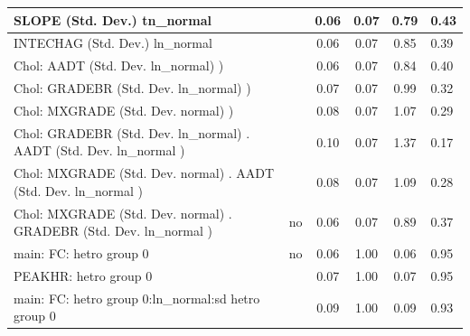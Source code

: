 \begin{table}
\begin{center}
\begin{tabular}{|l|l|c|c|c|l|}
			\hline
			SLOPE (Std. Dev.) tn_normal &  & 0.06 & 0.07 & 0.79 & 0.43 \\
			\hline
			INTECHAG (Std. Dev.) ln_normal &  & 0.06 & 0.07 & 0.85 & 0.39 \\
			\hline
			 Chol: AADT (Std. Dev. ln_normal) ) &  & 0.06 & 0.07 & 0.84 & 0.40 \\
			\hline
			 Chol: GRADEBR (Std. Dev. ln_normal) ) &  & 0.07 & 0.07 & 0.99 & 0.32 \\
			\hline
			 Chol: MXGRADE (Std. Dev. normal) ) &  & 0.08 & 0.07 & 1.07 & 0.29 \\
			\hline
			 Chol: GRADEBR (Std. Dev. ln_normal) . AADT (Std. Dev.   ln_normal ) &  & 0.10 & 0.07 & 1.37 & 0.17 \\
			\hline
			 Chol: MXGRADE (Std. Dev. normal) . AADT (Std. Dev.   ln_normal ) &  & 0.08 & 0.07 & 1.09 & 0.28 \\
			\hline
			 Chol: MXGRADE (Std. Dev. normal) . GRADEBR (Std. Dev.   ln_normal ) & no & 0.06 & 0.07 & 0.89 & 0.37 \\
			\hline
			main: FC: hetro group 0 & no & 0.06 & 1.00 & 0.06 & 0.95 \\
			\hline
			PEAKHR: hetro group 0 &  & 0.07 & 1.00 & 0.07 & 0.95 \\
			\hline
			main: FC: hetro group 0:ln_normal:sd  hetro group 0 &  & 0.09 & 1.00 & 0.09 & 0.93 \\
			\hline
		\end{tabular}
	\end{center}
\end{table}